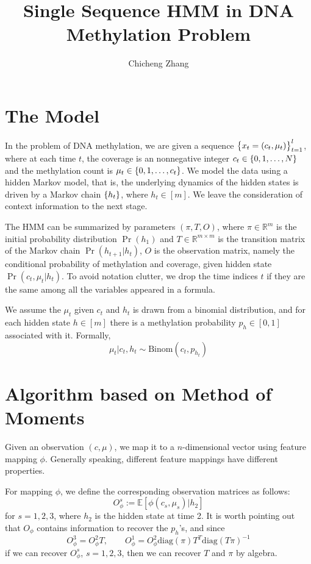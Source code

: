 \documentclass{article}
\title{Single Sequence HMM in DNA Methylation Problem}
\author{Chicheng Zhang}
\def\E{\mathbb{E}}
\def\R{\mathbb{R}}
\def\Bin{\text{Binom}}
\def\diag{\text{diag}}
\begin{document}
\maketitle

\section{The Model}

In the problem of DNA methylation, we are given a sequence $\cbr{x_t = (c_t, \mu_t)}_{t=1}^l$, where at each time $t$, the coverage is an nonnegative integer $c_t \in \cbr{0,1,\ldots,N}$ and the methylation count is $\mu_t \in \cbr{0,1,\ldots,c_t}$. We model the data using a hidden Markov model, that is, the underlying dynamics of the hidden states is driven by a Markov chain $\cbr{h_t}$, where $h_t \in [m]$. We leave the consideration of context information to the next stage.

The HMM can be summarized by parameters $(\pi, T, O)$, where $\pi \in \R^m$ is the initial probability distribution $\Pr(h_1)$ and $T \in \R^{m \times m}$ is the transition matrix of the Markov chain $\Pr(h_{t+1} | h_t)$, $O$ is the observation matrix, namely the conditional probability of methylation and coverage, given hidden state $\Pr(c_t, \mu_t | h_t)$. To avoid notation clutter, we drop the time indices $t$ if they are the same among all the variables appeared in a formula.

We assume the $\mu_t$ given $c_t$ and $h_t$ is drawn from a binomial distribution, and for each hidden state $h \in [m]$ there is a methylation probability $p_h \in [0,1]$ associated with it. Formally,
\[ \mu_t | c_t, h_t \sim \Bin(c_t, p_{h_t}) \]

\section{Algorithm based on Method of Moments}

Given an observation $(c, \mu)$, we map it to a $n$-dimensional vector using feature mapping $\phi$. Generally speaking, different feature mappings have different properties.

For mapping $\phi$, we define the corresponding observation matrices as follows:
\[ O_{\phi}^s := \E[\phi(c_s,\mu_s) | h_2] \]
for $s = 1,2,3$, where $h_2$ is the hidden state at time 2. It is worth pointing out that $O_\phi$ contains information to recover the $p_h$'s, and since
\[ O_{\phi}^3 = O_{\phi}^2 T, \qquad O_{\phi}^1 = O_{\phi}^2 \diag(\pi) T^T \diag(T\pi)^{-1}\]
if we can recover $O_{\phi}^s$, $s = 1,2,3$, then we can recover $T$ and $\pi$ by algebra.
\end{document}
